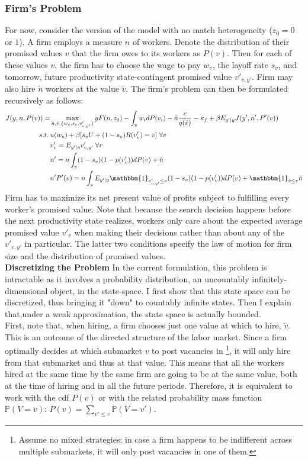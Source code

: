 \subsubsection*{Firm's Problem}
For now, consider the version of the model with no match heterogeneity ($z_0=0$ or $1$). A firm employs a measure $n$ of workers. Denote the distribution of their promised values $v$ that the firm owes to its workers as $P(v)$. Then for each of these values $v$, the firm has to choose the wage to pay $w_v$, the layoff rate $s_v$, and tomorrow, future productivity state-contingent promised value $v'_{v,y'}$. Firm may also hire $\tilde{n}$ workers at the value $\tilde{v}$.
The firm's problem can then be formulated recursively as follows:
\begin{equation*}
    \begin{split}
    J(y,n,P(v)) = & \max_{\tilde{n},\tilde{v},\{w_v,s_v,v'_{v,y'}\}} yF(n,z_0) - \int_v w_i dP(v_i) -\tilde{n}\frac{c}{q(\tilde{v})} -\kappa_f+ \beta E_{y'|y} J(y',n',P'(v)) \\
     s.t. \: & u(w_v) + \beta [s_v U + (1-s_v)R(v'_{v})=v] \; \forall v \\
    & v'_v = E_{y'|y} v'_{v,y'} \; \forall v \\
    & n' = n\int_v (1-s_v)(1-p(v'_v))dP(v)+\tilde{n} \\
    & n'P'(v) = n\int_v E_{y'|y}\mathbbm{1}_{v'_{v,y'}\leq v} (1-s_v)(1-p(v'_v))dP(v)+\mathbbm{1}_{\tilde{v}\leq v}\tilde{n}
    \end{split}
\end{equation*}
Firm has to maximize its net present value of profits subject to fulfilling every worker's promised value. 
Note that because the search decision happens before the next productivity state realizes, workers only care about the expected average promised value $v'_v$ when making their decisions rather than about any of the $v'_{v,y'}$ in particular. The latter two conditions specify the law of motion for firm size and the distribution of promised values. \\
\textbf{Discretizing the Problem} \label{subsection:discrete} In the current formulation, this problem is intractable as it involves a probability distribution, an uncountably infinitely-dimensional object, in the state-space. I first show that this state space can be discretized, thus bringing it "down" to countably infinite states. Then I explain that,under a weak approximation, the state space is actually bounded. \\
First, note that, when hiring, a firm chooses just one value at which to hire, $\tilde{v}$. This is an outcome of the directed structure of the labor market. Since a firm optimally decides at which submarket $v$ to post vacancies in \footnote{Assume no mixed strategies: in case a firm happens to be indifferent across multiple submarkets, it will only post vacancies in one of them.}, it will only hire from that submarket and thus at that value. This means that all the workers hired at the same time by the same firm are going to be at the same value, both at the time of hiring and in all the future periods. Therefore, it is equivalent to work with the cdf $P(v)$ or with the related probability mass function $\mathbb{P}(V=v)$: $P(v)=\sum_{v'\leq v}\mathbb{P}(V=v')$. 
